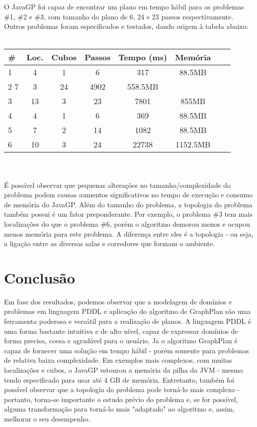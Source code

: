 \documentclass[letterpaper]{article}
\begin{document}
O JavaGP foi capaz de encontrar um plano em tempo hábil para os problemas \#1, \#2 e \#3, com tamanho do plano de 6, 24 e 23 passos respectivamente. Outros problemas foram especificados e testados, dando origem à tabela abaixo: \\
\\
\begin{tabular}{l*{6}{c}r}
\#  & Loc. & Cubos & Passos & Tempo (ms) & Memória \\
\hline
1  &     4 &     1 &      6 &        317 &  88.5MB \\
2        7 &     3 &     24 &       4902 & 558.5MB \\
3  &    13 &     3 &     23 &       7801 &   855MB \\
\hline
4  &     4 &     1 &      6 &        369 &   88.5MB \\
5  &     7 &     2 &     14 &       1082 &   88.5MB \\
6  &    10 &     3 &     24 &      22738 & 1152.5MB \\
\end{tabular} \\\\

É possível observar que pequenas alterações no tamanho/complexidade do problema podem causas aumentos significativos no tempo de execução e consumo de memória do JavaGP. Além do tamanho do problema, a topologia do problema também possui é um fator preponderante. Por exemplo, o problema \#3 tem mais localizações do que o problema \#6, porém o algoritmo demorou menos e ocupou menos memória para este problema. A diferença entre eles é a topologia - ou seja, a ligação entre as diversas salas e corredores que formam o ambiente.

\section{Conclusão}

Em fase dos resultados, podemos observar que a modelagem de domínios e problemas em linguagem PDDL e aplicação do algoritmo de GraphPlan são uma ferramenta poderosa e versátil para a realização de planos. A linguagem PDDL é uma forma bastante intuitiva e de alto nível, capaz de expressar domínios de forma precisa, coesa e agradável para o usuário. Ja o algoritmo GraphPlan é capaz de fornecer uma solução em tempo hábil - porém somente para problemas de relativa baixa complexidade. Em exemplos mais complexos, com muitas localizações e cubos, o JavaGP estourou a memória da pilha da JVM - mesmo tendo especificado para usar até 4 GB de memória. Entretanto, também foi possível observar que a topologia do problema pode torná-lo mais complexo - portanto, torna-se importante o estudo prévio do problema e, se for possível, alguma transformação para torná-lo mais "adaptado" ao algoritmo e, assim, melhorar o seu desempenho.
\end{document}
